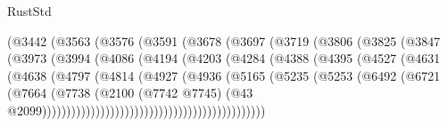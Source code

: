 \begin{lexlean}{RustStd}
\begin{coremodule}
{\begin{coremodule}
{{{{{{{{{{{{{{{{{{{{{{{{{{{{{{{{{{{{{{{{{{{{{{{{{{                            (@3442
                              (@3563
                                (@3576
                                  (@3591
                                    (@3678
                                      (@3697
                                        (@3719
                                          (@3806
                                            (@3825
                                              (@3847
                                                (@3973
                                                  (@3994
                                                    (@4086
                                                      (@4194
                                                        (@4203
                                                          (@4284
                                                            (@4388
                                                              (@4395
                                                                (@4527
                                                                  (@4631
                                                                    (@4638
                                                                      (@4797
                                                                        (@4814
                                                                          (@4927
                                                                            (@4936
                                                                              (@5165
                                                                                (@5235
                                                                                  (@5253
                                                                                    (@6492
                                                                                      (@6721
                                                                                        (@7664
                                                                                          (@7738
                                                                                            (@2100
                                                                                              (@7742
                                                                                                @7745)
                                                                                              (@43
                                                                                                @2099))))))))))))))))))))))))))))))))))))))))))))))
}}}}}}}}}}}}}}}}}}}}}}}}}}}}}}}}}}}}}}}}}}}}}}}}}}
\end{coremodule}}
\end{coremodule}
\end{lexlean}
